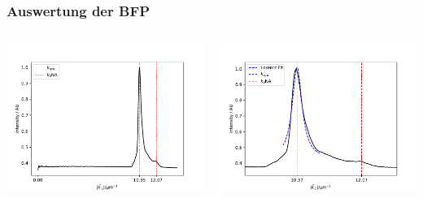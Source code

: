 \documentclass[aspectratio=1610]{beamer}
\begin{document}
			\begin{frame}
				\frametitle{Auswertung der BFP}
				\begin{columns}
					\begin{column}{0.5\textwidth}
						\includegraphics[width=\textwidth]{figures/example_radial.pdf}
					\end{column}
					\begin{column}{0.5\textwidth}  %
						\includegraphics[width=\textwidth]{figures/lorenz_profile.pdf}
					\end{column}
				\end{columns}
			\end{frame}
\end{document}
